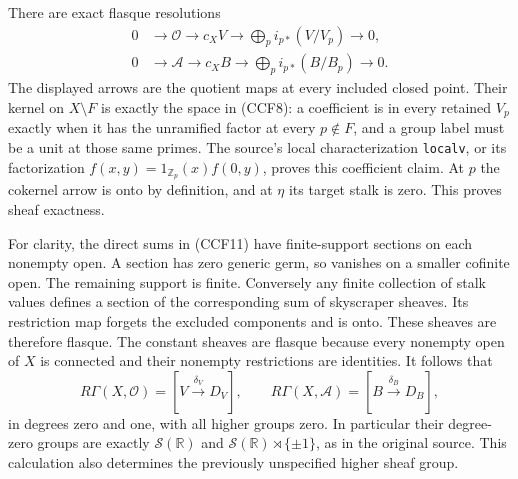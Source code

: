 There are exact flasque resolutions
\[
 \begin{aligned}
 0&\longrightarrow\mathcal O\longrightarrow c_XV
       \longrightarrow\bigoplus_p i_{p*}(V/V_p)\longrightarrow0,\\
 0&\longrightarrow\mathcal A\longrightarrow c_XB
       \longrightarrow\bigoplus_p i_{p*}(B/B_p)\longrightarrow0.
 \end{aligned}
 \tag{CCF11}
\]
The displayed arrows are the quotient maps at every included
closed point. Their kernel on $X\setminus F$ is exactly the
space in (CCF8): a coefficient is in every retained $V_p$ exactly
when it has the unramified factor at every $p\notin F$, and a
group label must be a unit at those same primes. The source's
local characterization \texttt{localv}, or its factorization
$f(x,y)=1_{\mathbb Z_p}(x)f(0,y)$, proves this coefficient claim.
At $p$ the cokernel arrow is onto by definition, and at $\eta$
its target stalk is zero. This proves sheaf exactness.

For clarity, the direct sums in (CCF11) have finite-support
sections on each nonempty open. A section has zero generic germ,
so vanishes on a smaller cofinite open. The remaining support is
finite. Conversely any finite collection of stalk values defines
a section of the corresponding sum of skyscraper sheaves. Its
restriction map forgets the excluded components and is onto.
These sheaves are therefore flasque. The constant sheaves are
flasque because every nonempty open of $X$ is connected and
their nonempty restrictions are identities. It follows that
\[
 R\Gamma(X,\mathcal O)=[V\xrightarrow{\delta_V}D_V],\qquad
 R\Gamma(X,\mathcal A)=[B\xrightarrow{\delta_B}D_B],
 \tag{CCF12}
\]
in degrees zero and one, with all higher groups zero. In
particular their degree-zero groups are exactly
$\mathcal S(\mathbb R)$ and $\mathcal S(\mathbb R)\rtimes\{\pm1\}$,
as in the original source. This calculation also determines the
previously unspecified higher sheaf group.

